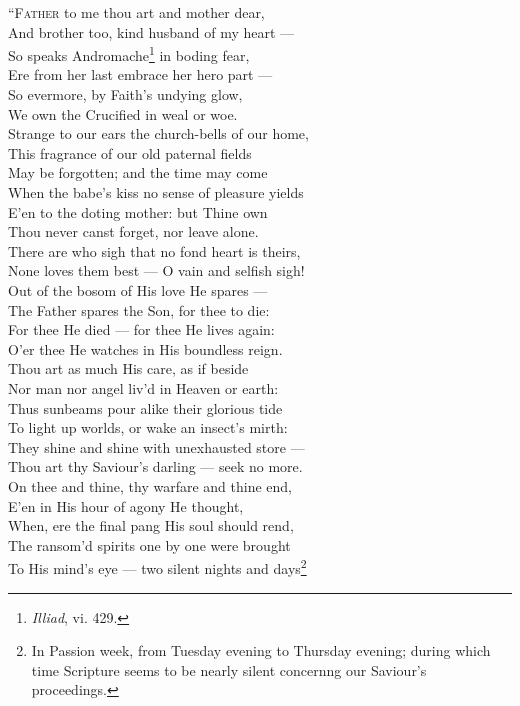“\textsc{Father} to me thou art and mother dear, \\
 And brother too, kind husband of my heart — \\
 So speaks Andromache\footnote{\emph{Illiad}, vi. 429.} in boding fear, \\
 Ere from her last embrace her hero part — \\
 So evermore, by Faith’s undying glow, \\
 We own the Crucified in weal or woe. \\
  Strange to our ears the church-bells of our home, \\
 This fragrance of our old paternal fields \\
 May be forgotten; and the time may come \\
 When the babe’s kiss no sense of pleasure yields \\
 E’en to the doting mother: but Thine own \\
 Thou never canst forget, nor leave alone. \\
  There are who sigh that no fond heart is theirs, \\
 None loves them best — O vain and selfish sigh! \\
 Out of the bosom of His love He spares — \\
 The Father spares the Son, for thee to die: \\
 For thee He died — for thee He lives again: \\
 O’er thee He watches in His boundless reign. \\
  Thou art as much His care, as if beside \\
 Nor man nor angel liv’d in Heaven or earth: \\
 Thus sunbeams pour alike their glorious tide \\
 To light up worlds, or wake an insect’s mirth: \\
 They shine and shine with unexhausted store — \\
 Thou art thy Saviour’s darling — seek no more. \\
  On thee and thine, thy warfare and thine end, \\
 E’en in His hour of agony He thought, \\
 When, ere the final pang His soul should rend, \\
 The ransom’d spirits one by one were brought \\
 To His mind’s eye — two silent nights and days\footnote{In Passion week, from Tuesday evening to Thursday evening; during which time Scripture seems to be nearly silent concernng our Saviour’s proceedings.} \\
